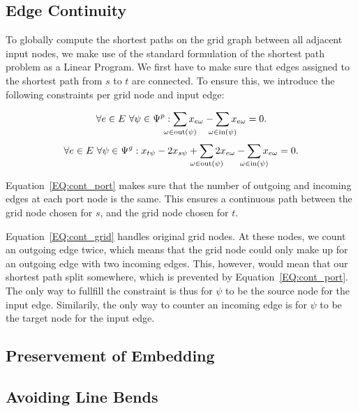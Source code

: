 \documentclass{sig-alternate-sigmod09}
\begin{document}
\subsection{Edge Continuity}

To globally compute the shortest paths on the grid graph between all adjacent input nodes, we make use of the standard formulation of the shortest path problem as a Linear Program.
We first have to make sure that edges assigned to the shortest path from $s$ to $t$ are connected.
To ensure this, we introduce the following constraints per grid node and input edge:

\newcommand\Psum[1]{\sum_{\makebox[0pt]{$\scriptstyle#1$}}}

\begin{equation}
  \forall e \in E\ \forall \psi \in \Psi^p: \Psum{\omega \in \text{out}(\psi)} x_{e\omega} - \Psum{\omega \in \text{in}(\psi)} x_{e\omega} = 0. \label{EQ:cont_port}
\end{equation}
\begin{equation}
	\begin{split}
  	\forall e \in E\ \forall \psi \in \Psi^g: x_{t\psi} - 2x_{s\psi} + \Psum{\omega \in \text{out}(\psi)} 2x_{e\omega} - \Psum{\omega \in \text{in}(\psi)} x_{e\omega} = 0. \label{EQ:cont_grid}
  \end{split}
\end{equation}

Equation~\ref{EQ:cont_port} makes sure that the number of outgoing and incoming edges at each port node is the same.
This ensures a continuous path between the grid node chosen for $s$, and the grid node chosen for $t$.

Equation~\ref{EQ:cont_grid} handles original grid nodes.
At these nodes, we count an outgoing edge twice, which means that the grid node could only make up for an outgoing edge with two incoming edges.
This, however, would mean that our shortest path split somewhere, which is prevented by Equation~\ref{EQ:cont_port}.
The only way to fullfill the constraint is thus for $\psi$ to be the source node for the input edge.
Similarily, the only way to counter an incoming edge is for $\psi$ to be the target node for the input edge.

\subsection{Preservement of Embedding}



\subsection{Avoiding Line Bends}
\end{document}
